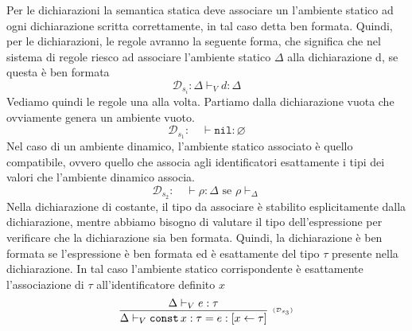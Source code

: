 \documentclass[oneside,a4paper,11pt]{book}
\theoremstyle{italicstyle}
\theoremstyle{normStyle}
\begin{document}
Per le dichiarazioni la semantica statica deve associare un l’ambiente
statico ad ogni dichiarazione scritta correttamente, in tal caso detta
ben formata. Quindi, per le dichiarazioni, le regole avranno la
seguente forma, che significa che nel sistema di regole riesco ad
associare l’ambiente statico $\Delta$ alla dichiarazione d, se questa è ben
formata
\[
  \mathcal{D}_{s_i}: \Delta \vdash_V d: \Delta
\]
Vediamo quindi le regole una alla volta. Partiamo dalla 
dichiarazione vuota che ovviamente genera un ambiente vuoto.
\[
  \mathcal{D}_{s_1}:\quad\vdash \texttt{nil}: \varnothing
\]
Nel caso di un ambiente dinamico, l'ambiente statico associato è quello compatibile,
ovvero quello che associa agli identificatori esattamente i tipi dei valori 
che l'ambiente dinamico associa.
\[
  \mathcal{D}_{s_2}:\quad\vdash\rho: \Delta \text{ se }\rho \vdash_\Delta
\]
Nella dichiarazione di costante, il tipo da associare è stabilito esplicitamente
dalla dichiarazione, mentre abbiamo bisogno di valutare il tipo dell’espressione
per verificare che la dichiarazione sia ben formata. Quindi, la dichiarazione
è ben formata se l’espressione è ben formata ed è esattamente del tipo $\tau$
presente nella dichiarazione. In
tal caso l’ambiente statico corrispondente è esattamente l’associazione
di $\tau$ all’identificatore definito $x$
\[
  \infer[\scriptscriptstyle (\mathcal{D}_{s_3})]
    {
      \Delta \vdash_V \texttt{const}\,x:\tau = e : [x \leftarrow \tau]
    }
    {
      \Delta \vdash_V e : \tau
    }
\]
\end{document}
